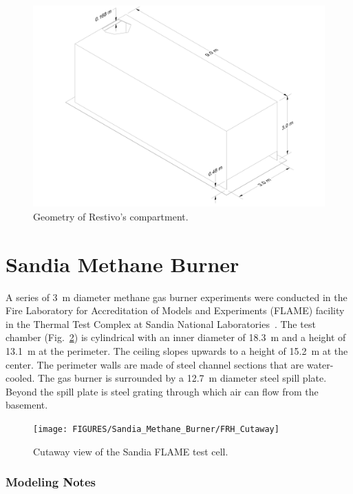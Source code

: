 \begin{figure}[ht]
\includegraphics[width=\textwidth]{FIGURES/Restivo_Experiment/Restivo_Drawing}
\caption[Geometry of Restivo's compartment]{Geometry of Restivo's compartment.}
\label{Restivo_Drawing}
\end{figure}

\section{Sandia Methane Burner}
\label{Sandia_Methane_Burner_Description}

A series of 3~m diameter methane gas burner experiments were conducted in the Fire Laboratory for Accreditation of Models and Experiments (FLAME) facility in the Thermal Test Complex at Sandia National Laboratories~\cite{Blanchat:2011}. The test chamber (Fig.~\ref{FRH_Cutaway}) is cylindrical with an inner diameter of 18.3~m and a height of 13.1~m at the perimeter. The ceiling slopes upwards to a height of 15.2~m at the center. The perimeter walls are made of steel channel sections that are water-cooled. The gas burner is surrounded by a 12.7~m diameter steel spill plate. Beyond the spill plate is steel grating through which air can flow from the basement.

\begin{figure}[!ht]
\texttt{[image: FIGURES/Sandia\_Methane\_Burner/FRH\_Cutaway]}
\caption[Cutaway view of the Sandia FLAME test cell]{Cutaway view of the Sandia FLAME test cell.}
\label{FRH_Cutaway}
\end{figure}

\subsubsection{Modeling Notes}


